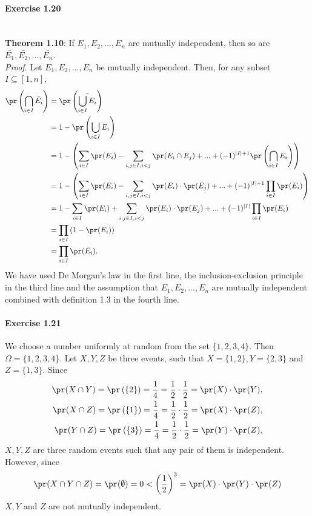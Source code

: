 \paragraph{Exercise 1.20} $~$ \\[0.2cm]
\textbf{Theorem 1.10}: If $E_1, E_2, ..., E_n$ are mutually independent, then so
are $\bar{E_1}, \bar{E_2}, ..., \bar{E_n}$. \\[0.2cm]
\textit{Proof}. Let $E_1, E_2, ..., E_n$ be mutually independent. Then, for any
subset $I \subseteq [1, n]$,
\begin{align*}
  \pr\left(\bigcap_{i \in I} \bar{E_i}\right)
    &= \pr\left(\bar{\bigcup_{i \in I} E_i}\right) \\
    &= 1 - \pr\left(\bigcup_{i \in I} E_i\right) \\
    &= 1 - \left( \sum_{i \in I}\pr(E_i) - \sum_{i,j \in I, i < j} \pr(E_i \cap E_j) + ... + (-1)^{|I| + 1}\pr\left(\bigcap_{i\in I}E_i\right) \right) \\
    &= 1 - \left( \sum_{i \in I} \pr(E_i) - \sum_{i,j \in I, i < j} \pr(E_i) \cdot \pr(E_j) + ... + (-1)^{|I| + 1}\prod_{i\in I} \pr(E_i) \right) \\
    &= 1 - \sum_{i \in I}\pr(E_i) + \sum_{i,j \in I, i < j} \pr(E_i) \cdot \pr(E_j) + ... + (-1)^{|I|}\prod_{i\in I} \pr(E_i) \\
    &= \prod_{i \in I}\left(1 - \pr(E_i)\right) \\
    &= \prod_{i \in I}\pr(\bar{E_i}).
\end{align*}
We have used De Morgan's law in the first line, the inclusion-exclusion principle
in the third line and the assumption that $E_1, E_2, ..., E_n$ are mutually
independent combined with definition 1.3 in the fourth line.

\paragraph{Exercise 1.21} We choose a number uniformly at random from the set
$\{ 1, 2, 3, 4 \}$. Then $\Omega = \{ 1, 2, 3, 4 \}$. Let $X, Y, Z$ be three events,
such that $X = \{ 1, 2 \}, Y = \{ 2, 3 \}$ and $Z = \{ 1, 3 \}$. Since
\begin{align*}
  \pr(X \cap Y) = \pr\left(\{ 2 \}\right) = \frac{1}{4}
    = \frac{1}{2} \cdot \frac{1}{2} = \pr(X) \cdot \pr(Y), \\
  \pr(X \cap Z) = \pr\left(\{ 1 \}\right) = \frac{1}{4}
    = \frac{1}{2} \cdot \frac{1}{2} = \pr(X) \cdot \pr(Z), \\
  \pr(Y \cap Z) = \pr\left(\{ 3 \}\right) = \frac{1}{4}
    = \frac{1}{2} \cdot \frac{1}{2} = \pr(Y) \cdot \pr(Z),
\end{align*}
$X, Y, Z$ are three random events such that any pair of them is independent.
However, since
\[
  \pr(X \cap Y \cap Z) = \pr(\emptyset) = 0
    < \left(\frac{1}{2}\right)^3 = \pr(X) \cdot \pr(Y) \cdot \pr(Z)
\]
$X, Y$ and $Z$ are not mutually independent.

